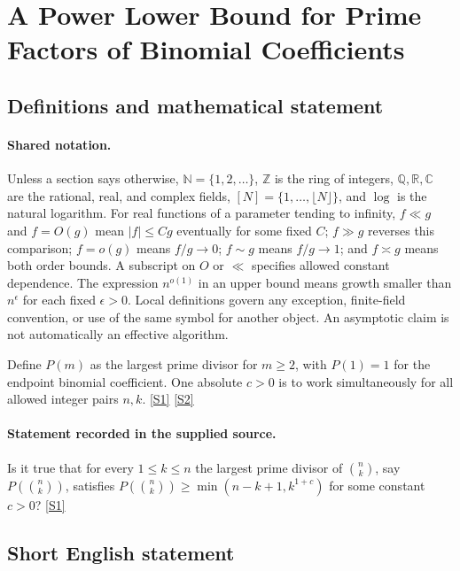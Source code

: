 \documentclass[11pt,a4paper]{article}
\newcommand{\N}{\mathbb{N}}
\newcommand{\Z}{\mathbb{Z}}
\newcommand{\Q}{\mathbb{Q}}
\newcommand{\R}{\mathbb{R}}
\newcommand{\C}{\mathbb{C}}
\newcommand{\sref}[2]{\hyperlink{source:#1:#2}{[S#2]}}
\begin{document}
\section{A Power Lower Bound for Prime Factors of Binomial Coefficients}\label{statement}


\subsection{Definitions and mathematical statement}

\paragraph{Shared notation.}Unless a section says otherwise, $\N=\{1,2,\ldots\}$,
$\Z$ is the ring of integers, $\Q,\R,\C$ are the rational, real, and complex
fields, $[N]=\{1,\ldots,\lfloor N\rfloor\}$, and $\log$ is the natural
logarithm. For real functions of a parameter tending to infinity,
$f\ll g$ and $f=O(g)$ mean $|f|\leq Cg$ eventually for some fixed $C$;
$f\gg g$ reverses this comparison; $f=o(g)$ means $f/g\to0$;
$f\sim g$ means $f/g\to1$; and $f\asymp g$ means both order bounds.
A subscript on $O$ or $\ll$ specifies allowed constant dependence.
The expression $n^{o(1)}$ in an upper bound means growth smaller than
$n^\epsilon$ for each fixed $\epsilon>0$. Local definitions govern any
exception, finite-field convention, or use of the same symbol for another
object. An asymptotic claim is not automatically an effective algorithm.



Define $P(m)$ as the largest prime divisor for $m\geq2$, with $P(1)=1$ for the endpoint binomial coefficient. One absolute $c>0$ is to work simultaneously for all allowed integer pairs $n,k$. \sref{statement}{1} \sref{statement}{2}

\paragraph{Statement recorded in the supplied source.}
Is it true that for every $1\leq k\leq n$ the largest prime divisor of $\binom{n}{k}$, say $P(\binom{n}{k})$, satisfies $ P\left(\binom{n}{k}\right)\geq \min(n-k+1, k^{1+c}) $ for some constant $c>0$? \sref{statement}{1}

\subsection{Short English statement}
\end{document}

